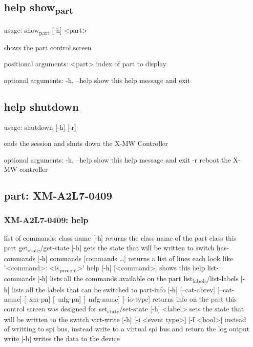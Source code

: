 \documentclass[11pt]{article}
\begin{document}
\subsection{help show\textsubscript{part}}
\label{sec:org75357c3}
usage: show\textsubscript{part} [-h] <part>

shows the part control screen

positional arguments:
  <part>      index of part to display

optional arguments:
  -h, --help  show this help message and exit

\subsection{help shutdown}
\label{sec:orge028b1e}
usage: shutdown [-h] [-r]

ends the session and shuts down the X-MW Controller

optional arguments:
  -h, --help  show this help message and exit
  -r          reboot the X-MW controller

\subsection{part: XM-A2L7-0409}
\label{sec:orgca57987}
\subsubsection{XM-A2L7-0409: help}
\label{sec:orge684cc0}
list of commands:
  class-name [-h]
    returns the class name of the part class this part
  get\textsubscript{state}/get-state [-h]
    gets the state that will be written to switch
  has-commands [-h] commands [commands \ldots{}]
    returns a list of lines each look like '<command>: <is\textsubscript{present}>'
  help [-h] [<command>]
    shows this help
  list-commands [-h]
    lists all the commands available on the part
  list\textsubscript{labels}/list-labels [-h]
    lists all the labels that can be switched to
  part-info  [-h] [--cat-abrev] [--cat-name] [--xm-pn] [--mfg-pn] [--mfg-name]
          [--io-type]
    returns info on the part this control screen was designed for
  set\textsubscript{state}/set-state [-h] <label>
    sets the state that will be written to the switch
  virt-write [-h] [-i <event type>] [-f <bool>]
    instead of writting to spi bus, instead write to a virtual spi bus
    and return the log output
  write [-h]
    writes the data to the device
\end{document}
